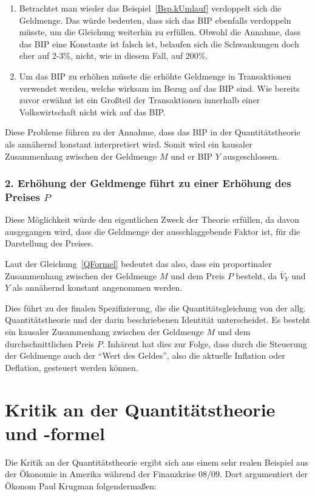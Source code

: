 \begin{enumerate}
    \item Betrachtet man wieder das Beispiel\, \vref*{Bsp.kUmlauf} verdoppelt sich die Geldmenge. Das würde bedeuten, dass sich das BIP ebenfalls verdoppeln müsste, um die Gleichung weiterhin zu erfüllen. Obwohl die Annahme, dass das BIP eine Konstante ist falsch ist, belaufen sich die Schwankungen doch eher auf 2-3\%, nicht, wie in diesem Fall, auf 200\%.
    \item Um das BIP zu erhöhen müsste die erhöhte Geldmenge in Transaktionen verwendet werden, welche wirksam im Bezug auf das BIP sind. Wie bereits zuvor erwähnt ist ein Großteil der Transaktionen innerhalb einer Volkswirtschaft nicht wirk auf das BIP.
\end{enumerate}

Diese Probleme führen zu der Annahme, dass das BIP in der Quantitätstheorie als annähernd konstant interpretiert wird. Somit wird ein kausaler Zusammenhang zwischen der Geldmenge $M$ und er BIP $Y$ ausgeschlossen.

\subsubsection*{2. Erhöhung der Geldmenge führt zu einer Erhöhung des Preises $P$}
Diese Möglichkeit würde den eigentlichen Zweck der Theorie erfüllen, da davon ausgegangen wird, dass die Geldmenge der ausschlaggebende Faktor ist, für die Darstellung des Preises.

Laut der Gleichung\, \vref*{QFormel} bedeutet das also, dass ein proportinaler Zusammenhang zwischen der Geldmenge $M$ und dem Preis $P$ besteht, da $\overline{V}_Y$ und $Y$ als annähernd konstant angenommen werden.

Dies führt zu der finalen Spezifizierung, die die Quantitätsgleichung von der allg. Quantitätstheorie und der darin beschriebenen Identität unterscheidet. Es besteht ein kausaler Zusammenhang zwischen der Geldmenge $M$ und dem durchschnittlichen Preis $P$.
Inhärent hat dies zur Folge, dass durch die Steuerung der Geldmenge auch der \enquote{Wert des Geldes}, also die aktuelle Inflation oder Deflation, gesteuert werden können.

\section{Kritik an der Quantitätstheorie und -formel}

Die Kritik an der Quantitätstheorie ergibt sich aus einem sehr realen Beispiel aus der Ökonomie in Amerika während der Finanzkrise 08/09. Dort argumentiert der Ökonom Paul Krugman folgendermaßen:

